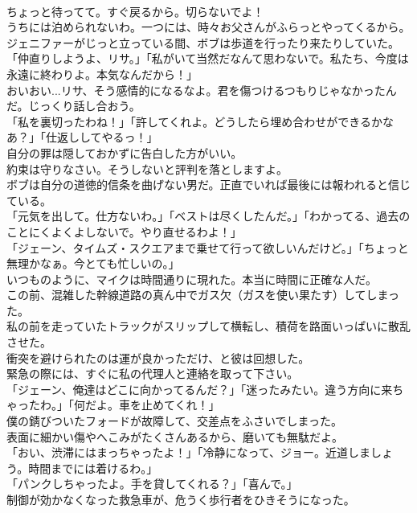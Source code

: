 \documentclass[8pt]{extreport}
\begin{document}
\begin{CJK}{UTF8}{min}
\\	ちょっと待ってて。すぐ戻るから。切らないでよ！
\\	うちには泊められないわ。一つには、時々お父さんがふらっとやってくるから。
\\	ジェニファーがじっと立っている間、ボブは歩道を行ったり来たりしていた。
\\	「仲直りしようよ、リサ。」「私がいて当然だなんて思わないで。私たち、今度は永遠に終わりよ。本気なんだから！」
\\	おいおい...リサ、そう感情的になるなよ。君を傷つけるつもりじゃなかったんだ。じっくり話し合おう。
\\	「私を裏切ったわね！」「許してくれよ。どうしたら埋め合わせができるかなあ？」「仕返ししてやるっ！」
\\	自分の罪は隠しておかずに告白した方がいい。
\\	約束は守りなさい。そうしないと評判を落としますよ。
\\	ボブは自分の道徳的信条を曲げない男だ。正直でいれば最後には報われると信じている。
\\	「元気を出して。仕方ないわ。」「ベストは尽くしたんだ。」「わかってる、過去のことにくよくよしないで。やり直せるわよ！」
\\	「ジェーン、タイムズ・スクエアまで乗せて行って欲しいんだけど。」「ちょっと無理かなぁ。今とても忙しいの。」
\\	いつものように、マイクは時間通りに現れた。本当に時間に正確な人だ。
\\	この前、混雑した幹線道路の真ん中でガス欠（ガスを使い果たす）してしまった。
\\	私の前を走っていたトラックがスリップして横転し、積荷を路面いっぱいに散乱させた。
\\	衝突を避けられたのは運が良かっただけ、と彼は回想した。
\\	緊急の際には、すぐに私の代理人と連絡を取って下さい。
\\	「ジェーン、俺達はどこに向かってるんだ？」「迷ったみたい。違う方向に来ちゃったわ。」「何だよ。車を止めてくれ！」
\\	僕の錆びついたフォードが故障して、交差点をふさいでしまった。
\\	表面に細かい傷やへこみがたくさんあるから、磨いても無駄だよ。
\\	「おい、渋滞にはまっちゃったよ！」「冷静になって、ジョー。近道しましょう。時間までには着けるわ。」
\\	「パンクしちゃったよ。手を貸してくれる？」「喜んで。」
\\	制御が効かなくなった救急車が、危うく歩行者をひきそうになった。

\end{CJK}
\end{document}
